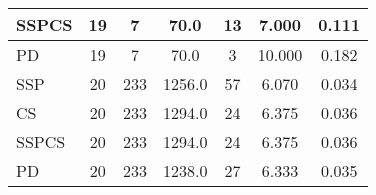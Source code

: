 \documentclass{article}
\begin{document}
\begin{table}[H]
{\begin{tabular}{|l|c|c|c|c|c|c|}
SSPCS              & 19             & 7                 & 70.0                   & 13             & 7.000                     & 0.111                                   \\ \hline
PD                 & 19             & 7                 & 70.0                   & 3              & 10.000                    & 0.182                                   \\ \hline
\hhline{|=======|}
SSP                & 20             & 233               & 1256.0                 & 57             & 6.070                     & 0.034                                   \\ \hline
CS                 & 20             & 233               & 1294.0                 & 24             & 6.375                     & 0.036                                   \\ \hline
SSPCS              & 20             & 233               & 1294.0                 & 24             & 6.375                     & 0.036                                   \\ \hline
PD                 & 20             & 233               & 1238.0                 & 27             & 6.333                     & 0.035                                   \\ \hline
\end{tabular}%
}
\label{tab:simulation2_set3_algorithm_metrics}
\end{table}

\begin{table}[H]
\centering
\caption{Simulation 2, Set 4: Graph Characteristics}
\label{tab:simulation2_set4_graph_characteristics}
\end{table}
\end{document}
